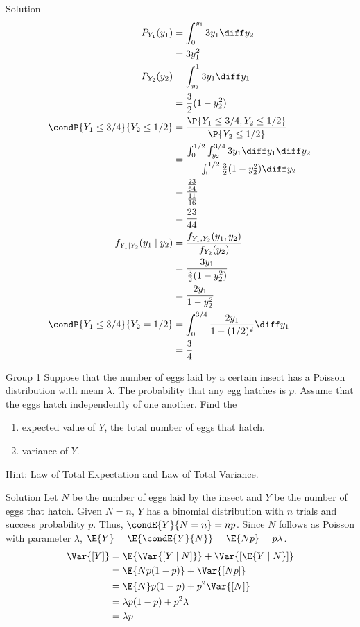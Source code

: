 \documentclass{article}
\theoremstyle{plain}
\theoremstyle{definition}
\theoremstyle{remark}
\begin{document}
\begin{solution}
    {Solution}
    \begin{align*}
        P_{Y_1}(y_1) &= \int_{0}^{y_1}3y_1\diff y_2 \\
        &= 3y_1^2 \\
        P_{Y_2}(y_2) &= \int_{y_2}^{1}3y_1\diff y_1 \\
        &= \frac{3}{2}(1-y_2^2) \\
        \condP{Y_1\leq 3/4}{Y_2\leq 1/2}
        &= \frac{\P{Y_1\leq 3/4,Y_2\leq 1/2}}{\P{Y_2\leq 1/2}} \\
        &= \frac{\int_{0}^{1/2}\int_{y_2}^{3/4}3y_1\diff y_1\diff y_2}{\int_{0}^{1/2}\frac{3}{2}(1-y_2^2)\diff y_2} \\
        &= \frac{\frac{23}{64}}{\frac{11}{16}} \\
        &= \frac{23}{44} \\
        f_{Y_1\mid Y_2}(y_1\mid y_2)
        &= \frac{f_{Y_1,Y_2}(y_1,y_2)}{f_{Y_2}(y_2)} \\
        &= \frac{3y_1}{\frac{3}{2}(1-y_2^2)} \\
        &= \frac{2y_1}{1-y_2^2} \\
        \condP{Y_1\leq 3/4}{Y_2=1/2}
        &= \int_{0}^{3/4}\frac{2y_1}{1-(1/2)^2}\diff y_1 \\
        &= \frac{3}{4}
    \end{align*}
\end{solution}
\begin{problem}
    {Group 1}
    Suppose that the number of eggs laid by a certain insect has a Poisson distribution with mean $\lambda$. The probability that any egg hatches is $p$. Assume that the eggs hatch independently of one another. Find the
    \begin{enumerate}
        \item expected value of $Y$, the total number of eggs that hatch.
        \item variance of $Y$.
    \end{enumerate}
    \begin{solution}
        {Hint:}
        Law of Total Expectation and Law of Total Variance.
    \end{solution}
\end{problem}

\begin{solution}
    {Solution}
    Let $N$ be the number of eggs laid by the insect and $Y$ be the number of eggs that hatch. Given $N = n$, $Y$ has a binomial distribution with $n$ trials and success probability $p$. Thus, $\condE{Y}{N = n} = np$. Since $N$ follows as Poisson with parameter $\lambda$, $\E{Y} = \E{\condE{Y}{N}} = \E{Np} = p\lambda$.
    \begin{align*}
        \Var{[Y]}
        &= \E{\Var{[Y\mid N]}}+\Var{[\E{Y\mid N}]} \\
        &= \E{Np(1-p)}+\Var{[Np]} \\
        &= \E{N}p(1-p)+p^2\Var{[N]} \\
        &= \lambda p(1-p)+p^2\lambda \\
        &= \lambda p
    \end{align*}
\end{solution}
\end{document}
